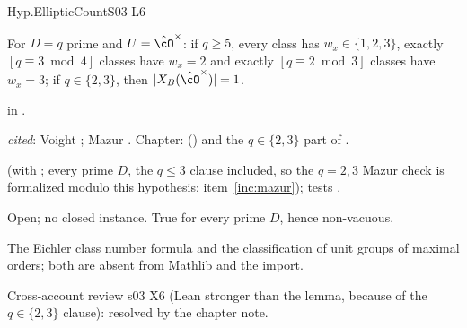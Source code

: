 \begin{hypentry}{Hyp.EllipticCount}{\kindlit}{S03-L6}
\item[Statement] For $D=q$ prime and $U=\hat\cO^\times$: if $q\ge5$, every class has $w_x\in\{1,2,3\}$, exactly
  $[q\equiv3\bmod4]$ classes have $w_x=2$ and exactly $[q\equiv2\bmod3]$ classes have $w_x=3$; if $q\in\{2,3\}$, then
  $|X_B(\hat\cO^\times)|=1$.
\item[Lean]  in .
\item[Source] \emph{cited}: Voight \cite[Thm.~11.5.14, 25.1.1, 30.1.5]{Vo}; Mazur \cite[App., Thm.~1.1(d)]{Mz}.
  Chapter:  (\stpmc) and the $q\in\{2,3\}$ part of .
\item[Used by]  (with ; every prime $D$, the $q\le3$ clause included, so the $q=2,3$ Mazur check is formalized modulo this hypothesis; item~\ref{inc:mazur}); tests .
\item[Status] Open; no closed instance. True for every prime $D$, hence non-vacuous.
\item[Discharge] The Eichler class number formula and the classification of unit groups of maximal orders; both are
  absent from Mathlib and the import.
\item[History] Cross-account review s03 X6 (Lean stronger than the lemma, because of the $q\in\{2,3\}$ clause):
  resolved by the chapter note.
\end{hypentry}

